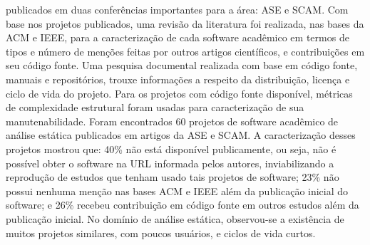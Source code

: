 publicados em duas conferências importantes para a área: ASE e SCAM.
%
Com base nos projetos publicados,  %
uma revisão da literatura foi realizada,
nas bases da ACM e IEEE, 
para a caracterização de cada software acadêmico em termos de
tipos e número de menções feitas por outros artigos científicos,
e contribuições em seu código fonte.
Uma pesquisa documental realizada com base em 
código fonte, manuais e repositórios, trouxe informações a respeito da
distribuição, licença e ciclo de vida do projeto.
Para os projetos com código fonte disponível, métricas de
complexidade estrutural foram usadas para caracterização de sua manutenabilidade.
Foram encontrados 60 projetos de software acadêmico de análise estática %
publicados em artigos da ASE e SCAM.
%
A caracterização desses projetos mostrou que: 
40\% não está disponível publicamente, ou seja, não é possível obter o software na URL informada pelos
autores, inviabilizando a reprodução de estudos que tenham usado tais projetos de software;
%
23\% não possui nenhuma menção nas bases
ACM e IEEE além da publicação inicial do software; 
e 26\% recebeu contribuição em código fonte em outros estudos
além da publicação inicial.
No domínio de análise estática, observou-se a existência de muitos projetos similares, com poucos
usuários, e ciclos de vida curtos.

%
%
